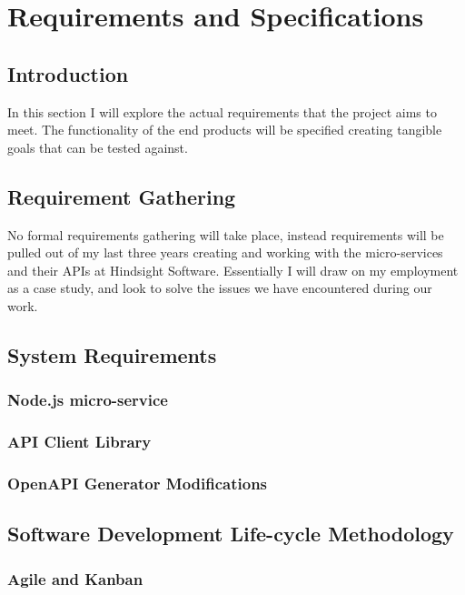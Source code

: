 \chapter{Requirements and Specifications}

\section{Introduction}
In this section I will explore the actual requirements that the project aims to meet. The functionality of the end products will be specified creating tangible goals that can be tested against.
\section{Requirement Gathering}
No formal requirements gathering will take place, instead requirements will be pulled out of my last three years creating and working with the micro-services and their APIs at Hindsight Software. Essentially I will draw on my employment as a case study, and look to solve the issues we have encountered during our work.
\section{System Requirements}
\subsection{Node.js micro-service}
\subsection{API Client Library}
\subsection{OpenAPI Generator Modifications}
\section{Software Development Life-cycle Methodology}
\subsection{Agile and Kanban}